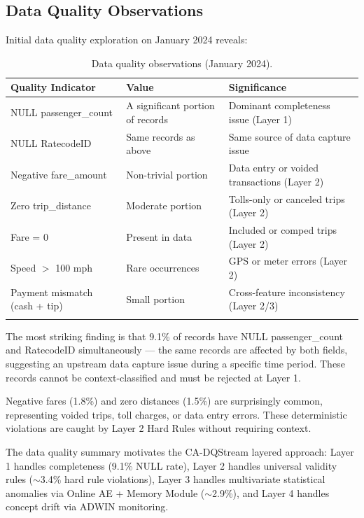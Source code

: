 \subsection{Data Quality Observations}

Initial data quality exploration on January 2024 reveals:

\begin{longtable}{|m{4cm}|m{3cm}|m{5.5cm}|}
\hline
\textbf{Quality Indicator} & \textbf{Value} & \textbf{Significance} \\ \hline
NULL passenger\_count & A significant portion of records & Dominant completeness issue (Layer 1) \\ \hline
NULL RatecodeID & Same records as above & Same source of data capture issue \\ \hline
Negative fare\_amount & Non-trivial portion & Data entry or voided transactions (Layer 2) \\ \hline
Zero trip\_distance & Moderate portion & Tolls-only or canceled trips (Layer 2) \\ \hline
Fare = 0 & Present in data & Included or comped trips (Layer 2) \\ \hline
Speed $>$ 100 mph & Rare occurrences & GPS or meter errors (Layer 2) \\ \hline
Payment mismatch (cash + tip) & Small portion & Cross-feature inconsistency (Layer 2/3) \\ \hline
\caption{Data quality observations (January 2024).}
\label{tab:dq_observations}
\end{longtable}

The most striking finding is that 9.1\% of records have NULL passenger\_count and RatecodeID simultaneously --- the same records are affected by both fields, suggesting an upstream data capture issue during a specific time period. These records cannot be context-classified and must be rejected at Layer 1.

Negative fares (1.8\%) and zero distances (1.5\%) are surprisingly common, representing voided trips, toll charges, or data entry errors. These deterministic violations are caught by Layer 2 Hard Rules without requiring context.

The data quality summary motivates the CA-DQStream layered approach: Layer 1 handles completeness (9.1\% NULL rate), Layer 2 handles universal validity rules ($\sim$3.4\% hard rule violations), Layer 3 handles multivariate statistical anomalies via Online AE + Memory Module ($\sim$2.9\%), and Layer 4 handles concept drift via ADWIN monitoring.

